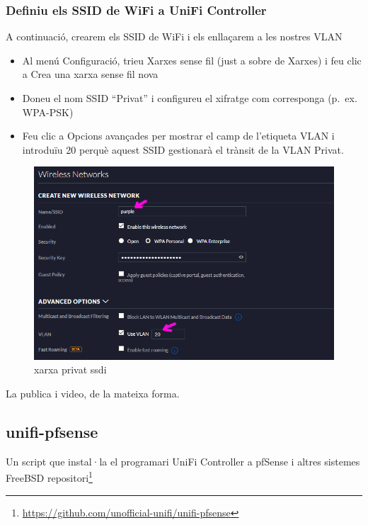 \documentclass[
  10pt,
]{krantz}
\DeclareRobustCommand{\href}[2]{#2\footnote{\url{#1}}}
\providecommand{\tightlist}{%
  \setlength{\itemsep}{0pt}\setlength{\parskip}{0pt}}
\begin{document}
\hypertarget{definiu-els-ssid-de-wifi-a-unifi-controller}{%
\subsubsection{Definiu els SSID de WiFi a UniFi Controller}\label{definiu-els-ssid-de-wifi-a-unifi-controller}}

A continuació, crearem els SSID de WiFi i els enllaçarem a les nostres VLAN

\begin{itemize}
\tightlist
\item
  Al menú Configuració, trieu Xarxes sense fil (just a sobre de Xarxes) i feu clic a Crea una xarxa sense fil nova
\item
  Doneu el nom SSID ``Privat'' i configureu el xifratge com corresponga (p.~ex. WPA-PSK)
\item
  Feu clic a Opcions avançades per mostrar el camp de l'etiqueta VLAN i introduïu 20 perquè aquest SSID gestionarà el trànsit de la VLAN Privat.
\end{itemize}

\begin{figure}
\centering
\includegraphics{imatges/wifi/unifi_04_privat_ssid.png}
\caption{xarxa privat ssdi}
\end{figure}

La publica i video, de la mateixa forma.

\hypertarget{unifi-pfsense}{%
\subsection{unifi-pfsense}\label{unifi-pfsense}}

Un script que instal·la el programari UniFi Controller a pfSense i altres sistemes FreeBSD \href{https://github.com/unofficial-unifi/unifi-pfsense}{repositori}
\end{document}
